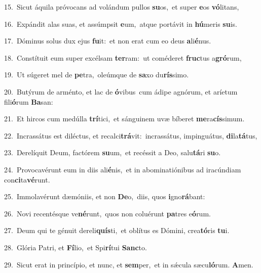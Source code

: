 {\numbfont\textcolor{\numbcolor}{15.}}~Sicut áquila próvocans ad volándum pullos \textbf{su}\-os,~\star et super \textbf{e}\-os \textbf{vó}\-litans,\par
{\numbfont\textcolor{\numbcolor}{16.}}~Expándit alas suas, et assúmpsit \textbf{e}\-um,~\star atque portávit in \textbf{hú}\-meris \textbf{su}\-is.\par
{\numbfont\textcolor{\numbcolor}{17.}}~Dóminus solus dux ejus \textbf{fu}\-it:~\star et non erat cum eo deus \textbf{a}\-li\-\textbf{é}\-nus.\par
{\numbfont\textcolor{\numbcolor}{18.}}~Constítuit eum super excélsam \textbf{ter}\-ram:~\star ut coméderet \textbf{fruc}\-tus a\-\textbf{gró}\-rum,\par
{\numbfont\textcolor{\numbcolor}{19.}}~Ut súgeret mel de \textbf{pe}\-tra,~\star oleúmque de \textbf{sa}\-xo du\-\textbf{rís}\-simo.\par
{\numbfont\textcolor{\numbcolor}{20.}}~Butýrum de arménto, et lac de \textbf{ó}\-vibus~\star cum ádipe agnórum, et aríetum fili\-\textbf{ó}\-rum \textbf{Ba}\-san:\par
{\numbfont\textcolor{\numbcolor}{21.}}~Et hircos cum medúlla \textbf{trí}\-tici,~\star et sánguinem uvæ bíberet \textbf{me}\-ra\-\textbf{cís}\-simum.\par
{\numbfont\textcolor{\numbcolor}{22.}}~Incrassátus est diléctus, et recalci\-\textbf{trá}\-vit:~\star incrassátus, impinguátus, \textbf{di}\-la\-\textbf{tá}\-tus,\par
{\numbfont\textcolor{\numbcolor}{23.}}~Derelíquit Deum, factórem \textbf{su}\-um,~\star et recéssit a Deo, salu\-\textbf{tá}\-ri \textbf{su}\-o.\par
{\numbfont\textcolor{\numbcolor}{24.}}~Provocavérunt eum in diis ali\-\textbf{é}\-nis,~\star et in abominatiónibus ad iracúndiam con\-\textbf{ci}\-ta\-\textbf{vé}\-runt.\par
{\numbfont\textcolor{\numbcolor}{25.}}~Immolavérunt dæmóniis, et non \textbf{De}\-o,~\star diis, quos \textbf{i}\-gno\-\textbf{rá}\-bant:\par
{\numbfont\textcolor{\numbcolor}{26.}}~Novi recentésque ve\-\textbf{né}\-runt,~\star quos non coluérunt \textbf{pa}\-tres e\-\textbf{ó}\-rum.\par
{\numbfont\textcolor{\numbcolor}{27.}}~Deum qui te génuit dereli\-\textbf{quís}\-ti,~\star et oblítus es Dómini, crea\-\textbf{tó}\-ris \textbf{tu}\-i.\par
{\numbfont\textcolor{\numbcolor}{28.}}~Glória Patri, et \textbf{Fí}\-lio,~\star et Spi\-\textbf{rí}\-tui \textbf{Sanc}\-to.\par
{\numbfont\textcolor{\numbcolor}{29.}}~Sicut erat in princípio, et nunc, et \textbf{sem}\-per,~\star et in sǽcula sæcu\-\textbf{ló}\-rum. \textbf{A}\-men.\par
